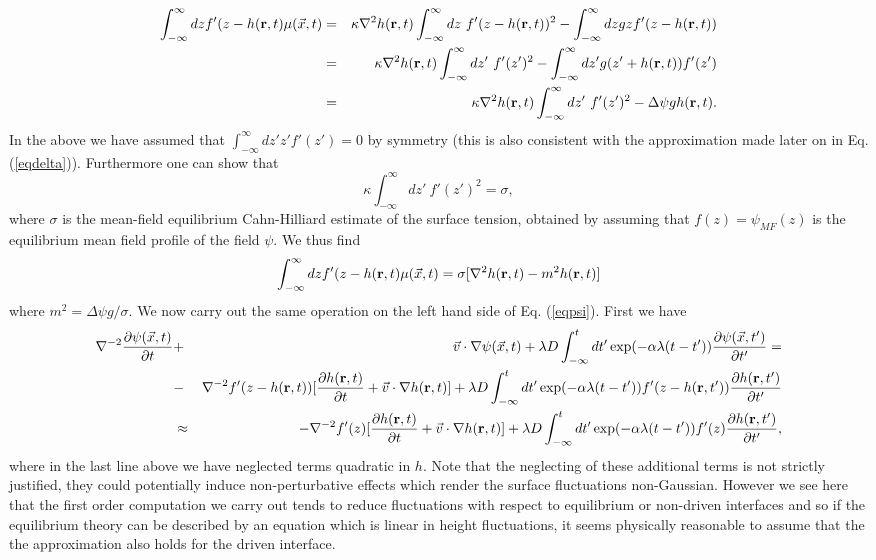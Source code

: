 \begin{eqnarray}
\int_{-\infty}^\infty dz f'(z-h({\bf r},t)\mu(\vec{x},t)&=& \kappa \nabla^2 h({\bf r},t)\int_{-\infty}^\infty dz\ f'(z-h({\bf r},t))^2 - \int_{-\infty}^\infty dz gz f'(z-h({\bf r},t))\nonumber \\&=&
\kappa\nabla^2 h({\bf r},t)\int_{-\infty}^\infty dz'\ f'(z')^2 - \int_{-\infty}^\infty dz' g(z' +h({\bf r},t)) f'(z')\nonumber \\
&=& \kappa\nabla^2 h({\bf r},t)\int_{-\infty}^\infty dz' \ f'(z')^2 -\Delta\psi g h({\bf r},t).
\end{eqnarray}
In the above we have assumed that $\int_{-\infty}^\infty dz' z'f'(z')=0$ by symmetry (this is also consistent with the approximation made later on in Eq. (\ref{eqdelta})). Furthermore one can show that \cite{bray2001,bray2002}
\begin{equation}
\kappa\int_{-\infty}^\infty dz' \ f'(z')^2 = \sigma,\label{mfsig}
\end{equation}
where $\sigma$ is the mean-field equilibrium Cahn-Hilliard estimate of the surface tension, obtained by  assuming that $f(z)=\psi_{MF}(z)$ is the equilibrium mean field profile of the field 
$\psi$. We thus find
\begin{equation}
\int_{-\infty}^\infty dz f'(z-h({\bf r},t)\mu(\vec{x},t) = \sigma[\nabla^2 h({\bf r},t)-m^2 h({\bf r},t)]
\end{equation}
where $m^2 = \Delta\psi g /\sigma$. We now carry out the same operation on the left hand side of Eq. (\ref{eqpsi}). First we have
\begin{eqnarray}
\nabla^{-2}\frac{\partial \psi(\vec{x},t)}{\partial t}&+&\vec{v}\cdot\nabla \psi(\vec{x},t) +\lambda D\int_{-\infty}^t dt'
\exp(-\alpha\lambda(t-t')) \frac{\partial \psi(\vec{x},t')}{\partial t'} = \nonumber \\ 
&-&\nabla^{-2}f'(z-h({\bf r},t))[\frac{\partial h({\bf r},t)}{\partial t} +\vec{v}\cdot\nabla h({\bf r},t)]  +\lambda D\int_{-\infty}^t dt'
\exp(-\alpha\lambda(t-t')) f'(z-h({\bf r},t'))\frac{\partial h({\bf r},t')}{\partial t'}\nonumber \\
&\approx& -\nabla^{-2}f'(z) [\frac{\partial h({\bf r},t)}{\partial t} +\vec{v}\cdot\nabla h({\bf r},t)] +\lambda D\int_{-\infty}^t dt'
\exp(-\alpha\lambda(t-t')) f'(z)\frac{\partial h({\bf r},t')}{\partial t'},\end{eqnarray}
where in the last line above we have neglected terms quadratic in $h$. 
Note that the neglecting of these additional terms is not strictly justified, they could potentially induce non-perturbative effects which render the surface fluctuations non-Gaussian. However we see here that the first order computation we carry out tends to reduce fluctuations with respect to equilibrium or non-driven interfaces and so if the equilibrium theory can be described by an equation which is linear in height fluctuations, it seems physically reasonable to assume that the the approximation also holds for the driven interface. 
